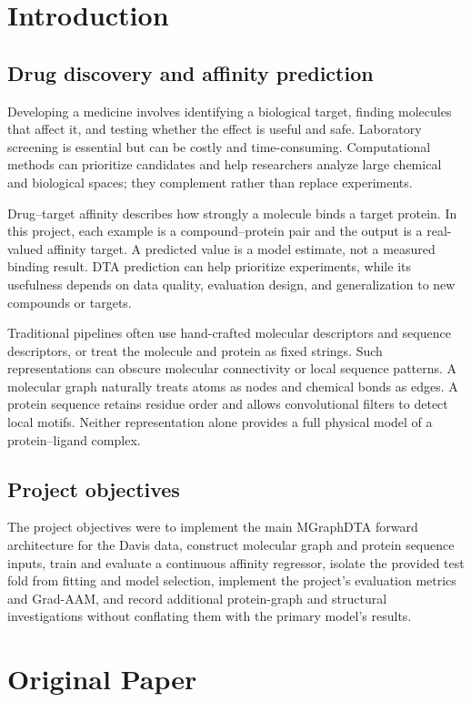 \chapter{Introduction}
\section{Drug discovery and affinity prediction}
Developing a medicine involves identifying a biological target, finding molecules that affect it, and testing whether the effect is useful and safe. Laboratory screening is essential but can be costly and time-consuming. Computational methods can prioritize candidates and help researchers analyze large chemical and biological spaces; they complement rather than replace experiments.

Drug--target affinity describes how strongly a molecule binds a target protein. In this project, each example is a compound--protein pair and the output is a real-valued affinity target. A predicted value is a model estimate, not a measured binding result. DTA prediction can help prioritize experiments, while its usefulness depends on data quality, evaluation design, and generalization to new compounds or targets.

Traditional pipelines often use hand-crafted molecular descriptors and sequence descriptors, or treat the molecule and protein as fixed strings. Such representations can obscure molecular connectivity or local sequence patterns. A molecular graph naturally treats atoms as nodes and chemical bonds as edges. A protein sequence retains residue order and allows convolutional filters to detect local motifs. Neither representation alone provides a full physical model of a protein--ligand complex.

\section{Project objectives}
The project objectives were to implement the main MGraphDTA forward architecture for the Davis data, construct molecular graph and protein sequence inputs, train and evaluate a continuous affinity regressor, isolate the provided test fold from fitting and model selection, implement the project's evaluation metrics and Grad-AAM, and record additional protein-graph and structural investigations without conflating them with the primary model's results.

\chapter{Original Paper}

